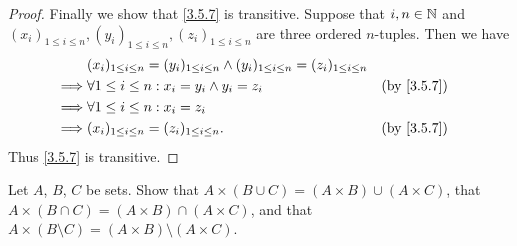 \begin{proof}
	Finally we show that \cref{3.5.7} is transitive.
	Suppose that \(i, n \in \mathbb{N}\) and \((x_i)_{1 \leq i \leq n}, (y_i)_{1 \leq i \leq n}, (z_i)_{1 \leq i \leq n}\) are three ordered \(n\)-tuples.
	Then we have
	\begin{align*}
		         & (x_i)_{1 \leq i \leq n} = (y_i)_{1 \leq i \leq n} \land (y_i)_{1 \leq i \leq n} = (z_i)_{1 \leq i \leq n}                 \\
		\implies & \forall 1 \leq i \leq n : x_i = y_i \land y_i = z_i                                                       &  & \by{3.5.7} \\
		\implies & \forall 1 \leq i \leq n : x_i = z_i                                                                                       \\
		\implies & (x_i)_{1 \leq i \leq n} = (z_i)_{1 \leq i \leq n}.                                                        &  & \by{3.5.7}
	\end{align*}
	Thus \cref{3.5.7} is transitive.
\end{proof}

\begin{ex}\label{ex:3.5.4}
	Let \(A\), \(B\), \(C\) be sets.
	Show that \(A \times (B \cup C) = (A \times B) \cup (A \times C)\), that \(A \times (B \cap C) = (A \times B) \cap (A \times C)\), and that \(A \times (B \setminus C) = (A \times B) \setminus (A \times C)\).
\end{ex}

